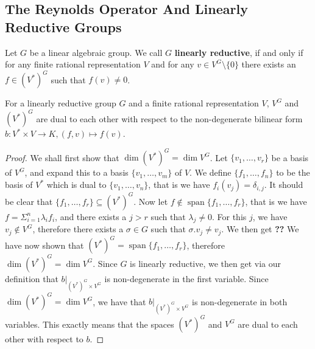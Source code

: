 \subsection{The Reynolds Operator And Linearly Reductive Groups}

\begin{definition}
  Let $G$ be a linear algebraic group.
  We call $G$ \textbf{linearly reductive}, if and only if for any finite rational representation $V$ and for any $v \in V^G \setminus \{ 0 \}$ there exists an $f \in \left( V^\ast \right)^G $ such that $f(v) \neq 0$.
\end{definition}

\begin{proposition}\label{dual}
  For a linearly reductive group $G$ and a finite rational representation $V$, $V^G$ and $(V^\ast)^G$ are dual to each other with respect to the non-degenerate bilinear form $ b\colon V^\ast \times V \longrightarrow K, (f,v) \mapsto f(v)$.
\end{proposition}

\begin{proof}
  We shall first show that $\operatorname{dim}(V^\ast)^G = \operatorname{dim}V^G$.
  Let $\{v_1, \ldots , v_r \}$ be a basis of $V^G$, and expand this to a basis $\{v_1, \ldots , v_m \}$ of $V$.
  We define $\{ f_1 , \ldots , f_n \}$ to be the basis of $V^\ast$ which is dual to $\{v_1, \ldots , v_n \}$, that is we have $ f_i (v_j) = \delta_{i,j} $.
  It should be clear that $\{f_1, \ldots , f_r \} \subseteq (V^\ast)^G$.
  Now let $f \notin \operatorname{span} \{ f_1, \ldots, f_r\}$, that is we have $f = \Sigma_{i=1}^n \lambda_i f_i $, and there exists a $j > r$ such that $ \lambda_j \neq 0$.
  For this $j$, we have $v_j \notin V^G$, therefore there exists a $\sigma \in G$ such that $\sigma . v_j \neq v_j$.
  We then get \textbf{??}
  We have now shown that $(V^\ast)^G = \operatorname{span}\{f_1,\dots,f_r\}$, therefore $\operatorname{dim}(V^\ast)^G = \operatorname{dim}V^G$.
  Since $G$ is linearly reductive, we then get via our definition that $\left. b \right|_{(V^\ast)^G \times V^G}$ is non-degenerate in the first variable.
  Since $\operatorname{dim}(V^\ast)^G = \operatorname{dim}V^G$, we have that $\left. b \right|_{(V^\ast)^G \times V^G}$ is non-degenerate in both variables.
  This exactly means that the spaces $(V^\ast)^G$ and $V^G$ are dual to each other with respect to $b$.
\end{proof}


